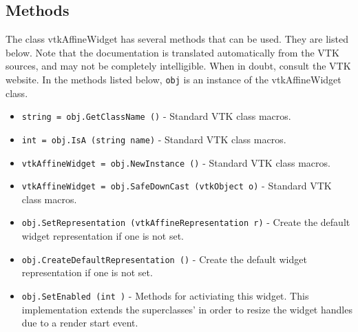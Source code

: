 \subsection{Methods}

The class vtkAffineWidget has several methods that can be used.
  They are listed below.
Note that the documentation is translated automatically from the VTK sources,
and may not be completely intelligible.  When in doubt, consult the VTK website.
In the methods listed below, \verb|obj| is an instance of the vtkAffineWidget class.
\begin{itemize}
\item  \verb|string = obj.GetClassName ()| -  Standard VTK class macros.

\item  \verb|int = obj.IsA (string name)| -  Standard VTK class macros.

\item  \verb|vtkAffineWidget = obj.NewInstance ()| -  Standard VTK class macros.

\item  \verb|vtkAffineWidget = obj.SafeDownCast (vtkObject o)| -  Standard VTK class macros.

\item  \verb|obj.SetRepresentation (vtkAffineRepresentation r)| -  Create the default widget representation if one is not set. 

\item  \verb|obj.CreateDefaultRepresentation ()| -  Create the default widget representation if one is not set. 

\item  \verb|obj.SetEnabled (int )| -  Methods for activiating this widget. This implementation extends the
 superclasses' in order to resize the widget handles due to a render
 start event.

\end{itemize}
